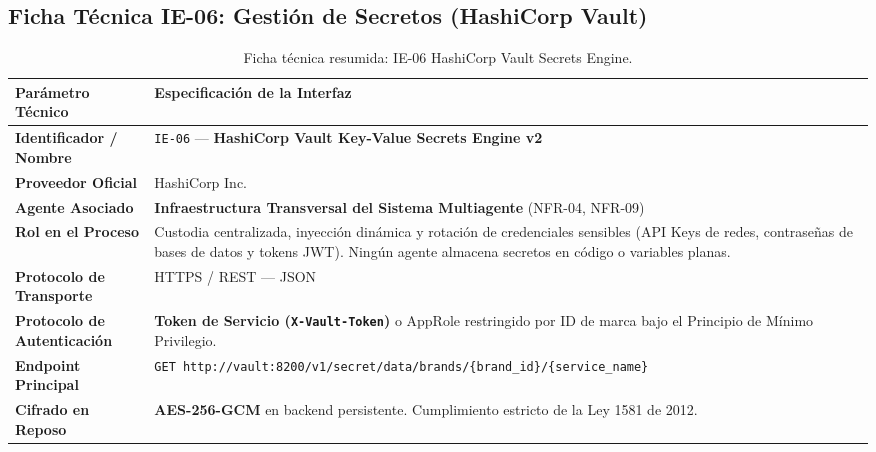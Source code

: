 \documentclass[11pt,a4paper]{article}
\begin{document}
\subsection{Ficha Técnica IE-06: Gestión de Secretos (HashiCorp Vault)}\label{sec:ie06}
\begin{table}[h!]
\centering
\small
\begin{tabular}{p{4.5cm} p{11cm}}
\toprule
\textbf{Parámetro Técnico} & \textbf{Especificación de la Interfaz} \\
\midrule
\textbf{Identificador / Nombre} & \texttt{IE-06} --- \textbf{HashiCorp Vault Key-Value Secrets Engine v2} \\
\textbf{Proveedor Oficial} & HashiCorp Inc. \\
\textbf{Agente Asociado} & \textbf{Infraestructura Transversal del Sistema Multiagente} (NFR-04, NFR-09) \\
\textbf{Rol en el Proceso} & Custodia centralizada, inyección dinámica y rotación de credenciales sensibles (API Keys de redes, contraseñas de bases de datos y tokens JWT). Ningún agente almacena secretos en código o variables planas. \\
\textbf{Protocolo de Transporte} & HTTPS / REST --- JSON \\
\textbf{Protocolo de Autenticación} & \textbf{Token de Servicio (\texttt{X-Vault-Token})} o AppRole restringido por ID de marca bajo el Principio de Mínimo Privilegio. \\
\textbf{Endpoint Principal} & \texttt{GET http://vault:8200/v1/secret/data/brands/\{brand\_id\}/\{service\_name\}} \\
\textbf{Cifrado en Reposo} & \textbf{AES-256-GCM} en backend persistente. Cumplimiento estricto de la Ley 1581 de 2012. \\
\bottomrule
\end{tabular}
\caption{Ficha técnica resumida: IE-06 HashiCorp Vault Secrets Engine.}
\end{table}
\end{document}
